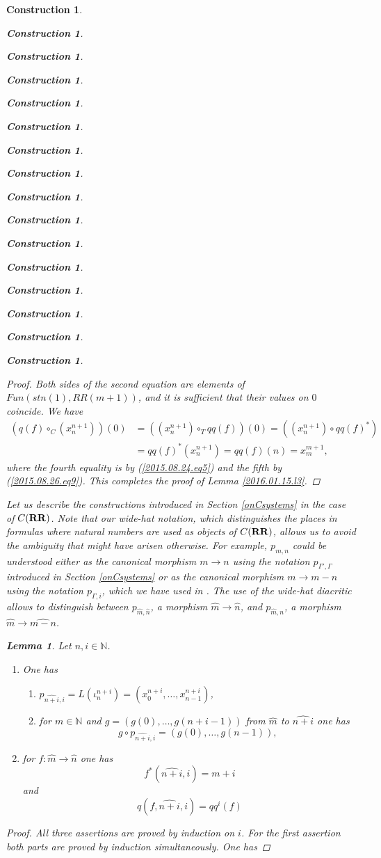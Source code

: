 \documentclass[onecolumn,12pt]{amsart}
\newtheorem{lemma}[proposition]{Lemma}
\numberwithin{proposition}{subsection}
\newtheorem{construction}[proposition]{Construction}
\newcommand{\sr}{\rightarrow}
\newcommand{\nn}{{\mathbb N}}
\newcommand{\nat}{\nn}
\newcommand{\wh}{\widehat}
\newcommand{\mbind}[1]{{#1^*}}
\newcommand{\RR}{{\bf RR}}
\begin{document}
\begin{construction}
\begin{construction}
\begin{construction}
\begin{construction}
\begin{construction}
\begin{construction}
\begin{construction}
\begin{construction}
\begin{construction}
\begin{construction}
\begin{construction}
\begin{construction}
\begin{construction}
\begin{construction}
\begin{construction}
\begin{construction}
\begin{proof}
Both sides of the second equation are elements of $Fun(stn(1),RR(m+1))$, and it
is sufficient that their values on $0$ coincide. We have
%
\begin{equation*}
  \begin{split}
    (q(f)\circ_C (x_n^{n+1}))(0)&=((x_n^{n+1})\circ_T qq(f))(0)=((x_n^{n+1})\circ \mbind{qq(f)})
    \\
    &= \mbind{qq(f)}(x_n^{n+1})=qq(f)(n)=x_m^{m+1},
  \end{split}
\end{equation*}
%
where the fourth equality is by (\ref{2015.08.24.eq5}) and the fifth by
(\ref{2015.08.26.eq9}). This completes the proof of Lemma \ref{2016.01.15.l3}.
\end{proof}

%
Let us describe the constructions introduced in Section \ref{onCsystems} in the
case of $C(\RR)$. Note that our wide-hat notation, which distinguishes the places
in formulas where natural numbers are used as objects of $C(\RR)$, allows us to
avoid the ambiguity that might have arisen otherwise. For example, $p_{m,n}$
could be understood either as the canonical morphism $m\sr n$ using the
notation $p_{\Gamma',\Gamma}$ introduced in Section \ref{onCsystems} or as the
canonical morphism $m\sr m-n$ using the notation $p_{\Gamma,i}$, which we have
used in \cite{Csubsystems}.  The use of the wide-hat diacritic allows to
distinguish between $p_{\wh{m},\wh{n}}$, a morphism $\wh{m}\sr \wh{n}$, and
$p_{\wh{m},n}$, a morphism $\wh{m}\sr \wh{m-n}$.
%
\begin{lemma}
\label{2015.08.22.l6}
Let $n,i\in\nat$. 
%
\begin{enumerate}
\item One has
%
\begin{enumerate}
\item $p_{\wh{n+i},i}=L(\iota^{n+i}_{n})=(x_0^{n+i},\dots,x_{n-1}^{n+i})$,
\item for $m\in\nat$ and $g=(g(0),\dots,g(n+i-1))$ from $\wh{m}$ to $\wh{n+i}$ one has 
%
$$g\circ p_{\wh{n+i},i}=(g(0),\dots,g(n-1)),$$
%
\end{enumerate}
%
\item for $f:\wh{m}\sr \wh{n}$ one has
%
$$f^*(\wh{n+i},i)=m+i$$
%
and
%
$$q(f,\wh{n+i},i)=qq^i(f)$$
%
\end{enumerate}
\end{lemma}
%
\begin{proof}
All three assertions are proved by induction on $i$. For the first assertion both
parts are proved by induction simultaneously. One has

\end{proof}
\end{construction}
\end{construction}
\end{construction}
\end{construction}
\end{construction}
\end{construction}
\end{construction}
\end{construction}
\end{construction}
\end{construction}
\end{construction}
\end{construction}
\end{construction}
\end{construction}
\end{construction}
\end{construction}
\end{document}
